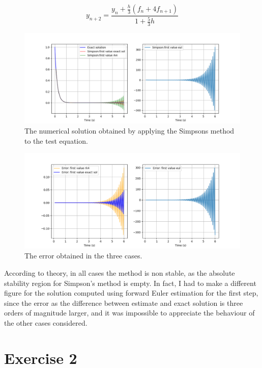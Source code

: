 \documentclass[a4paper,12pt]{article}
\begin{document}
\begin{equation}
    y_{n+2} =\frac{y_n + \frac{h}{3} (f_n + 4f_{n+1})}{1 + \frac{5}{3}h}
\end{equation}
\begin{figure}[H]
\centering
\includegraphics[width=1\textwidth]{simpsons.png}
\caption{The numerical solution obtained by applying the Simpsons method to the test equation.}
\label{fig:simpson_solution}
\end{figure}

\begin{figure}[H]
\centering
\includegraphics[width=1\textwidth]{simpsons_error.png}
\caption{The error obtained in the three cases.}
\label{fig:simpson_error}
\end{figure}
According to theory, in all cases the method is non stable, as the absolute stability region for Simpson's method is empty.
In fact, I had to make a different figure for the solution computed using forward Euler estimation for the first step, since the error as the difference between estimate and exact solution is three orders of magnitude larger, and it was impossible to appreciate the behaviour of the other cases considered.

\section{Exercise 2}
\end{document}
